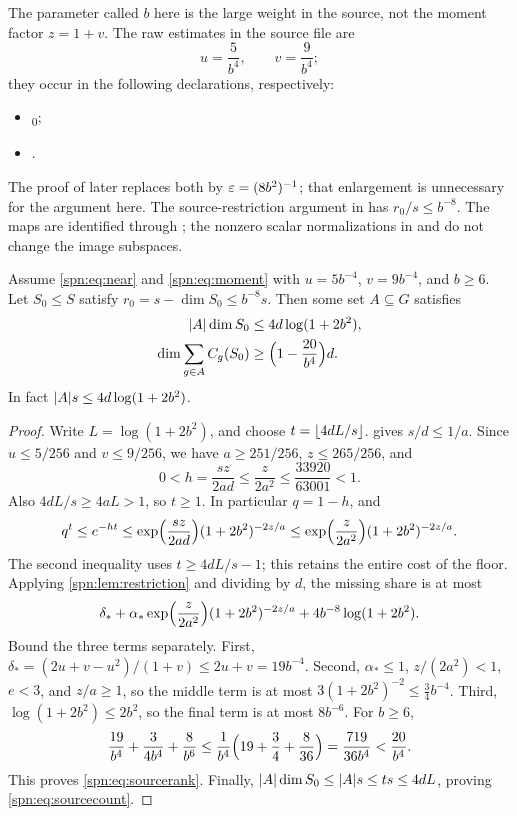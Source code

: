 The parameter called $b$ here is the large weight in the source, not the moment
factor $z=1+v$. The raw estimates in the source file
 are
\[
 u=\frac5{b^4},\qquad v=\frac9{b^4};
\]
they occur in the following declarations, respectively:
\begin{itemize}
\item {}\textsubscript{0};
\item {}.
\end{itemize}
The proof of  later replaces both by
$\varepsilon=(8b^2)^{-1}$; that enlargement is unnecessary for the argument here.
The source-restriction argument in  has
$r_0/s\le b^{-8}$. The maps are identified through ;
the nonzero scalar normalizations in  and
 do not change the image subspaces.

\begin{theorem}\label{spn:thm:source}
Assume \eqref{spn:eq:near} and \eqref{spn:eq:moment} with $u=5b^{-4}$,
$v=9b^{-4}$, and $b\ge6$. Let $S_0\le S$ satisfy
$r_0=s-\dim S_0\le b^{-8}s$. Then some set $A\subseteq G$ satisfies
\begin{align}
 \lvert A\rvert\dim S_0&\le4d\log(1+2b^2),\label{spn:eq:sourcecount}\\
 \dim\sum_{g\in A}C_g(S_0)&\ge\Bigl(1-\frac{20}{b^4}\Bigr)d.\label{spn:eq:sourcerank}
\end{align}
In fact $\lvert A\rvert s\le4d\log(1+2b^2)$.
\end{theorem}

\begin{proof}
Write $L=\log(1+2b^2)$, and choose $t=\lfloor4dL/s\rfloor$.  gives
$s/d\le1/a$. Since $u\le5/256$ and $v\le9/256$, we have $a\ge251/256$,
$z\le265/256$, and
\[
 0<h=\frac{sz}{2ad}\le\frac{z}{2a^2}\le\frac{33920}{63001}<1 .
\]
Also $4dL/s\ge4aL>1$, so $t\ge1$. In particular $q=1-h$, and
\[
 q^t\le e^{-ht}\le\exp\Bigl(\frac{sz}{2ad}\Bigr)(1+2b^2)^{-2z/a}
 \le\exp\Bigl(\frac{z}{2a^2}\Bigr)(1+2b^2)^{-2z/a}.
\]
The second inequality uses $t\ge4dL/s-1$; this retains the entire cost of the
floor. Applying \cref{spn:lem:restriction} and dividing by $d$, the missing
share is at most
\begin{equation}\label{spn:eq:exactsource}
 \delta_*+\alpha_*\exp\Bigl(\frac{z}{2a^2}\Bigr)(1+2b^2)^{-2z/a}
 +4b^{-8}\log(1+2b^2).
\end{equation}
Bound the three terms separately. First,
$\delta_*=(2u+v-u^2)/(1+v)\le2u+v=19b^{-4}$. Second, $\alpha_*\le1$,
$z/(2a^2)<1$, $e<3$, and $z/a\ge1$, so the middle term is at most
$3(1+2b^2)^{-2}\le\tfrac34b^{-4}$. Third, $\log(1+2b^2)\le2b^2$, so the final
term is at most $8b^{-6}$. For $b\ge6$,
\[
 \frac{19}{b^4}+\frac3{4b^4}+\frac8{b^6}
 \le\frac1{b^4}\Bigl(19+\frac34+\frac8{36}\Bigr)=\frac{719}{36b^4}
 <\frac{20}{b^4}.
\]
This proves \eqref{spn:eq:sourcerank}. Finally,
$\lvert A\rvert\dim S_0\le\lvert A\rvert s\le ts\le4dL$, proving \eqref{spn:eq:sourcecount}.
\end{proof}

